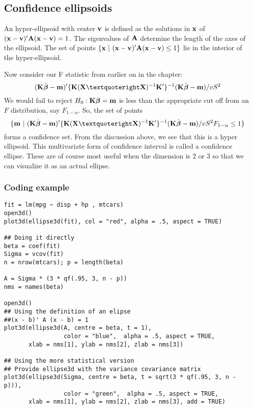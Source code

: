 \subsection{Confidence ellipsoids}

An hyper-ellipsoid with center $\mathbf{v}$ is defined as the solutions in $\mathbf{x}$ of 
$(\mathbf{x} - \mathbf{v})' \mathbf{A} (\mathbf{x} - \mathbf{v})=1$. The eigenvalues of $\mathbf{A}$ determine the length
of the axes of the ellipsoid. The set of points $\{\mathbf{x} ~|~ (\mathbf{x} - \mathbf{v})' \mathbf{A} (\mathbf{x} - \mathbf{v}) \leq 1\}$
lie in the interior of the hyper-ellipsoid. 

Now consider our F statistic from earlier on in the chapter:
$$
(\bK \hat \bbeta - \bm)'  \{\bK \xtxinv \bK'\}^{-1} (\bK \hat \bbeta - \bm) / v S^2
$$
We would fail to reject $H_0:\mathbf{K} \boldsymbol{\beta} = \mathbf{m}$ is less than the appropriate cut off 
from an $F$ distribution, say $F_{1-\alpha}$. So, the set of points
$$
\{\bm ~|~ 
(\bK \hat \bbeta - \bm)'  \{\bK \xtxinv \bK'\}^{-1} (\bK \hat \bbeta - \bm) / v S^2 F_{1-\alpha} \leq 1
\}
$$
forms a confidence set. From the discussion above, we see that this is a hyper ellipsoid.
This multivariate form of confidence interval is called a confidence ellipse. These are
of course most useful when the dimension is 2 or 3 so that we can visualize it as
an actual ellipse.

\subsubsection{Coding example}
\begin{verbatim}
fit = lm(mpg ~ disp + hp , mtcars)
open3d()
plot3d(ellipse3d(fit), col = "red", alpha = .5, aspect = TRUE)

## Doing it directly
beta = coef(fit)
Sigma = vcov(fit)
n = nrow(mtcars); p = length(beta)

A = Sigma * (3 * qf(.95, 3, n - p))
nms = names(beta)

open3d()
## Using the definition of an elipse
##(x - b)' A (x - b) = 1
plot3d(ellipse3d(A, centre = beta, t = 1), 
                 color = "blue",  alpha = .5, aspect = TRUE, 
       xlab = nms[1], ylab = nms[2], zlab = nms[3]) 

## Using the more statistical version
## Provide ellipse3d with the variance covariance matrix
plot3d(ellipse3d(Sigma, centre = beta, t = sqrt(3 * qf(.95, 3, n - p))), 
                 color = "green",  alpha = .5, aspect = TRUE, 
       xlab = nms[1], ylab = nms[2], zlab = nms[3], add = TRUE) 

\end{verbatim}


